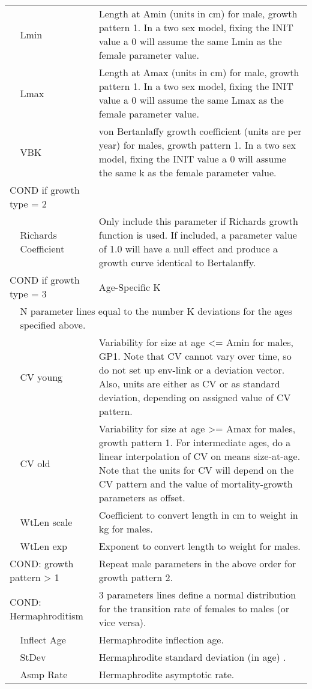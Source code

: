 \begin{longtable}{p{1cm} p{2.25cm} p{10cm}}
	& Lmin & Length at Amin (units in cm) for male, growth pattern 1. In a two sex model, fixing the INIT value a 0 will assume the same Lmin as the female parameter value.\\
	& Lmax & Length at Amax (units in cm) for male, growth pattern 1. In a two sex model, fixing the INIT value a 0 will assume the same Lmax as the female parameter value.\ \\
	& VBK &  von Bertanlaffy growth coefficient (units are per year) for males, growth pattern 1. In a two sex model, fixing the INIT value a 0 will assume the same k as the female parameter value.\Bstrut\\
	\hline

	\multicolumn{2}{l}{COND if growth type = 2 } & \Tstrut\\
	& Richards Coefficient & Only include this parameter if Richards growth function is used.  If included, a parameter value of 1.0 will have a null effect and produce a growth curve identical to Bertalanffy.\\
	\multicolumn{2}{l}{COND if growth type = 3 } & Age-Specific K \\
	& \multicolumn{2}{l}{N parameter lines equal to the number K deviations for the ages specified above.}\Bstrut\\
	\hline

	\Tstrut & CV young & Variability for size at age <= Amin for males, GP1.  Note that CV cannot vary over time, so do not set up env-link or a deviation vector.  Also, units are either as CV or as standard deviation, depending on assigned value of CV pattern.\\
	& CV old &  Variability for size at age >= Amax for males, growth pattern 1. For intermediate ages, do a linear interpolation of CV on means size-at-age.  Note that the units for CV will depend on the CV pattern and the value of mortality-growth parameters as offset.\\
	\hline

	\Tstrut & WtLen scale & Coefficient to convert length in cm to weight in kg for males.\\
    & WtLen exp & Exponent to convert length to weight for males.\Bstrut\\

	\multicolumn{2}{l}{COND: growth pattern > 1} \Tstrut & Repeat male parameters in the above order for growth pattern 2.\\
	\hline

	\multicolumn{2}{l}{COND: Hermaphroditism} \Tstrut & 3 parameters lines define a normal distribution for the transition rate of females to males (or vice versa).\\
	& Inflect Age & Hermaphrodite inflection age.\\
	& StDev & Hermaphrodite standard deviation (in age) .\\
	& Asmp Rate & Hermaphrodite asymptotic rate.\Bstrut\\
	\hline


\end{longtable}
